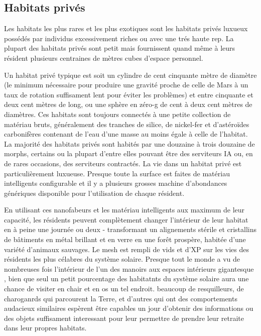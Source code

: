 \subsection{Habitats privés} \label{sec:private-habitats} 

Les habitats les plus rares et les plus exotiques sont les habitats privés luxueux possédés par individus excessivement riches ou avec une trés haute rep. La plupart des habitats privés sont petit mais fournissent quand même à leurs résident plusieurs centraines de mètres cubes d'espace personnel. 

Un habitat privé typique est soit un cylindre de cent cinquante mètre de diamètre (le minimum nécessaire pour produire une gravité proche de celle de Mars à un taux de rotation suffisament lent pour éviter les problèmes) et entre cinquante et deux cent mètres de long, ou une sphère en zéro-g de cent à deux cent mètres de diamètres. Ces habitats sont toujours connectés à une petite collection de matériau bruts, généralement des tranches de silice, de nickel-fer et d'astéroïdes carbonifères contenant de l'eau d'une masse au moins égale à celle de l'habitat. La majorité des habitats privés sont habités par une douzaine à trois douzaine de morphs, certains ou la plupart d'entre elles pouvant être des serviteurs IA ou, en de rares occasions, des serviteurs contractés. La vie dans un habitat privé est particulièrement luxueuse. Presque toute la surface est faites de matériau intelligents configurable et il y a plusieurs grosses machine d'abondances génériques disponible pour l'utilisation de chaque résident. 

En utilisant ces nanofabeurs et les matériau intelligents aux maximum de leur capacité, les résidents peuvent complètement changer l'intérieur de leur habitat en à peine une journée ou deux - transformant un alignements stérile et cristallins de bâtiments en métal brillant et en verre en une forêt prospère, habitée d'une variété d'animaux sauvages. Le mesh est rempli de vids et d'XP sur les vies des résidents les plus célabres du système solaire. Presque tout le monde a vu de nombreuses fois l'intérieur de l'un des manoirs aux espaces intérieurs gigantesque , bien que seul un petit pourcentage des habitatnts du système solaire aura une chance de visiter en chair et en os un tel endroit. beaucoup de resquilleurs, de charoganrds qui parcourent la Terre, et d'autres qui ont des comportements audacieux similaires espèrent  être capables un jour d'obtenir des informations ou des objets suffisament interessant pour leur permettre de prendre leur retraite dans leur propres habitats. 

